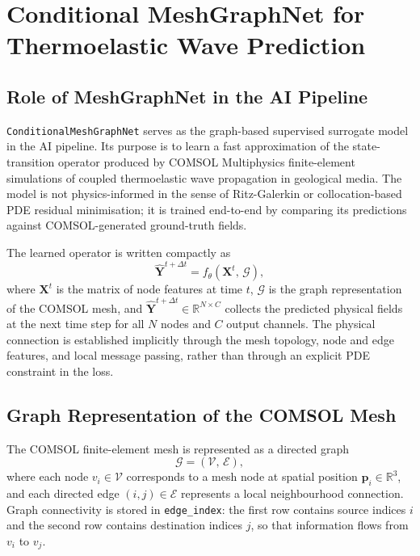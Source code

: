 
\section{Conditional MeshGraphNet for Thermoelastic Wave Prediction}

\subsection{Role of MeshGraphNet in the AI Pipeline}

\texttt{ConditionalMeshGraphNet} serves as the graph-based supervised surrogate
model in the AI pipeline.
Its purpose is to learn a fast approximation of the state-transition operator
produced by COMSOL Multiphysics finite-element simulations of coupled
thermoelastic wave propagation in geological media.
The model is not physics-informed in the sense of Ritz-Galerkin or
collocation-based PDE residual minimisation; it is trained end-to-end by
comparing its predictions against COMSOL-generated ground-truth fields.

The learned operator is written compactly as
\[
  \hat{\mathbf{Y}}^{t+\Delta t}
  = f_{\theta}\!\left(\mathbf{X}^{t},\,\mathcal{G}\right),
\]
where \(\mathbf{X}^{t}\) is the matrix of node features at time \(t\),
\(\mathcal{G}\) is the graph representation of the COMSOL mesh,
and \(\hat{\mathbf{Y}}^{t+\Delta t}\in\mathbb{R}^{N\times C}\) collects
the predicted physical fields at the next time step for all \(N\) nodes and
\(C\) output channels.
The physical connection is established implicitly through the mesh topology,
node and edge features, and local message passing, rather than through an
explicit PDE constraint in the loss.

\subsection{Graph Representation of the COMSOL Mesh}

The COMSOL finite-element mesh is represented as a directed graph
\[
  \mathcal{G} = (\mathcal{V},\,\mathcal{E}),
\]
where each node \(v_i\in\mathcal{V}\) corresponds to a mesh node at spatial
position \(\mathbf{p}_i\in\mathbb{R}^{3}\), and each directed edge
\((i,j)\in\mathcal{E}\) represents a local neighbourhood connection.
Graph connectivity is stored in \texttt{edge\_index}:
the first row contains source indices \(i\) and the second row contains
destination indices \(j\), so that information flows from \(v_i\) to \(v_j\).

